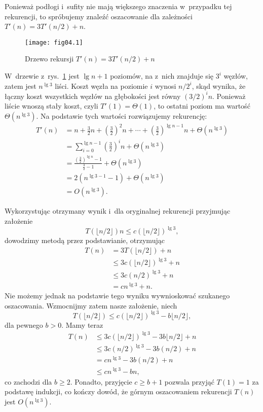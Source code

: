 \exercise %
Ponieważ podłogi i~sufity nie mają większego znaczenia w~przypadku tej rekurencji, to spróbujemy znaleźć oszacowanie dla zależności $T'(n)=3T'(n/2)+n$.
\begin{figure}[ht]
	\begin{center}
		\texttt{[image: fig04.1]}
	\end{center}
	\caption{Drzewo rekursji $T'(n)=3T'(n/2)+n$} \label{fig:4.2-1}
\end{figure}
W~drzewie z~rys.~\ref{fig:4.2-1} jest $\lg n+1$ poziomów, na  z~nich znajduje się $3^i$ węzłów, zatem jest $n^{\lg3}$ liści. Koszt węzła na poziomie $i$ wynosi $n/2^i$, skąd wynika, że łączny koszt wszystkich węzłów na  głębokości jest równy $(3/2)^in$. Ponieważ liście wnoszą stały koszt, czyli $T'(1)=\Theta(1)$, to ostatni poziom ma wartość $\Theta(n^{\lg3})$. Na podstawie tych wartości rozwiązujemy rekurencję:
\begin{align*}
	T'(n) &= n+\frac{3}{2}n+\left(\frac{3}{2}\right)^2n+\cdots+\left(\frac{3}{2}\right)^{\lg n-1}n+\Theta(n^{\lg 3}) \\
	&= \sum_{i=0}^{\lg n-1}\left(\frac{3}{2}\right)^in+\Theta(n^{\lg 3}) \\
	&= \frac{\left(\frac{3}{2}\right)^{\lg n}-1}{\frac{3}{2}-1}+\Theta(n^{\lg 3}) \\[1mm]
	&= 2(n^{\lg 3-1}-1)+\Theta(n^{\lg 3}) \\
	&= O(n^{\lg 3}).
\end{align*}

Wykorzystując otrzymany wynik i~dla oryginalnej rekurencji przyjmując założenie
\[
	T(\lfloor n/2\rfloor)n\le c(\lfloor n/2\rfloor)^{\lg 3},
\]
dowodzimy metodą przez podstawianie, otrzymując
\begin{align*}
	T(n) &= 3T(\lfloor n/2\rfloor)+n \\
	&\le 3c(\lfloor n/2\rfloor)^{\lg 3}+n \\
	&\le 3c(n/2)^{\lg 3}+n \\
	&= cn^{\lg 3}+n.
\end{align*}
Nie możemy jednak na podstawie tego wyniku wywnioskować szukanego oszacowania. Wzmocnijmy zatem nasze założenie, niech
\[
	T(\lfloor n/2\rfloor) \le c(\lfloor n/2\rfloor)^{\lg 3}-b\lfloor n/2\rfloor,
\]
dla pewnego $b>0$. Mamy teraz
\begin{align*}
	T(n) &\le 3c(\lfloor n/2\rfloor)^{\lg 3}-3b\lfloor n/2\rfloor+n \\
	&\le 3c(n/2)^{\lg 3}-3b(n/2)+n \\
	&= cn^{\lg 3}-3b(n/2)+n \\
	&\le cn^{\lg 3}-bn,
\end{align*}
co zachodzi dla $b\ge2$. Ponadto, przyjęcie $c\ge b+1$ pozwala przyjąć $T(1)=1$ za podstawę indukcji, co kończy dowód, że górnym oszacowaniem rekurencji $T(n)$ jest $O(n^{\lg3})$.

